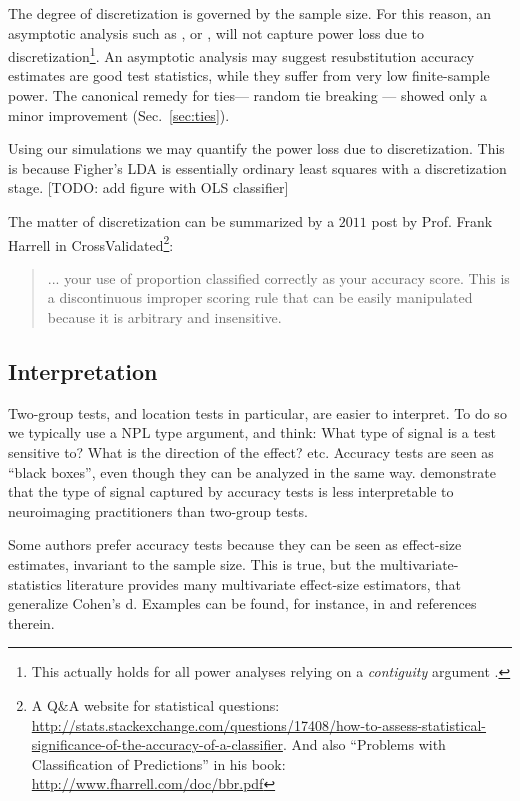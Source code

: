 \documentclass[onecolumn,draftclsnofoot]{IEEEtran}
\begin{document}
The degree of discretization is governed by the sample size. 
For this reason, an asymptotic analysis such as \cite{ramdas_classification_2016}, or \cite{golland_permutation_2005}, will not capture power loss due to discretization\footnote{This actually holds for all power analyses relying on a \emph{contiguity} argument \cite[Ch.6]{vaart_asymptotic_1998}.}.
An asymptotic analysis may suggest resubstitution accuracy estimates are good test statistics, while they suffer from very low finite-sample power. 
The canonical remedy for ties--- random tie breaking --- showed only a minor improvement (Sec.~\ref{sec:ties}).

Using our simulations we may quantify the power loss due to discretization. 
This is because Figher's LDA is essentially ordinary least squares with a discretization stage. 
[TODO: add figure with OLS classifier]

The matter of discretization can be summarized by a $2011$ post by Prof. Frank Harrell in \textsf{CrossValidated\footnote{A Q\&A website for statistical questions: \url{http://stats.stackexchange.com/questions/17408/how-to-assess-statistical-significance-of-the-accuracy-of-a-classifier}. And also ``Problems with Classification of Predictions'' in his book: \url{http://www.fharrell.com/doc/bbr.pdf}}}:
\begin{quote}
	... your use of proportion classified correctly as your accuracy score. This is a discontinuous improper scoring rule that can be easily manipulated because it is arbitrary and insensitive.
\end{quote}





\subsection{Interpretation}
Two-group tests, and location tests in particular, are easier to interpret. 
To do so we typically use a NPL type argument, and think:
What type of signal is a test sensitive to?
What is the direction of the effect? etc.
Accuracy tests are seen as ``black boxes'', even though they can be analyzed in the same way. 
\cite{gilron2017s} demonstrate that the type of signal captured by accuracy tests is less interpretable to neuroimaging practitioners than two-group tests. 

Some authors prefer accuracy tests because they can be seen as effect-size estimates, invariant to the sample size. 
This is true, but the multivariate-statistics literature provides many multivariate effect-size estimators, that generalize Cohen's d. 
Examples can be found, for instance, in \cite{stevens2012applied} and references therein. 
\end{document}
